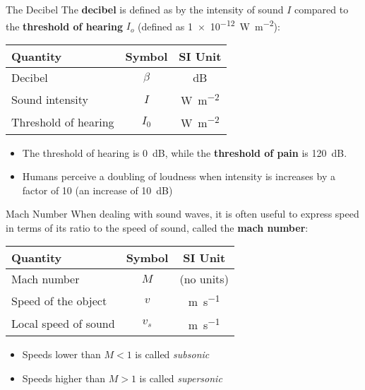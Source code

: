 \documentclass[12pt,aspectratio=169]{beamer}
\newcommand{\eq}[2]{\vspace{#1}{\Large\begin{displaymath}#2\end{displaymath}}}
\begin{document}
\begin{frame}{The Decibel}
  The \textbf{decibel} is defined as by the intensity of sound $I$ compared to
  the \textbf{threshold of hearing} $I_o$ (defined as
  \SI{1e-12}{\watt\per\metre^2}):
  
  \eq{-.2in}{
    \boxed{\beta=10\log_{10}\left[\frac{I}{I_0}\right]}
  }
  \begin{center}
    \begin{tabular}{l|c|c}
      \rowcolor{pink}
      \textbf{Quantity} & \textbf{Symbol} & \textbf{SI Unit} \\ \hline
      Decibel              & $\beta$ & \si{dB}\\
      Sound intensity      & $I$     & \si{\watt\per\metre^2}\\
      Threshold of hearing & $I_0$   &  \si{\watt\per\metre^2}
    \end{tabular}
  \end{center}  
  
  \begin{itemize}
  \item The threshold of hearing is \SI{0}{dB}, while the
    \textbf{threshold of pain} is \SI{120}{dB}.
  \item Humans perceive a doubling of loudness when intensity is increases by a
    factor of \num{10} (an increase of \SI{10}{dB})
  \end{itemize}
\end{frame}



\begin{frame}{Mach Number}
  When dealing with sound waves, it is often useful to express speed in terms
  of its ratio to the speed of sound, called the \textbf{mach number}:
  
  \eq{-.2in}{
    \boxed{M=\frac{v}{v_s}}
  }
  \begin{center}
    \begin{tabular}{l|c|c}
      \rowcolor{pink}
      \textbf{Quantity} & \textbf{Symbol} & \textbf{SI Unit} \\ \hline
      Mach number          & $M$   & (no units) \\
      Speed of the object  & $v$   & \si{\metre\per\second}\\
      Local speed of sound & $v_s$ & \si{\metre\per\second}
    \end{tabular}
  \end{center}
  \begin{itemize}
  \item Speeds lower than $M<1$ is called \emph{subsonic}
  \item Speeds higher than $M>1$ is called \emph{supersonic}
  \end{itemize}
\end{frame}
\end{document}

